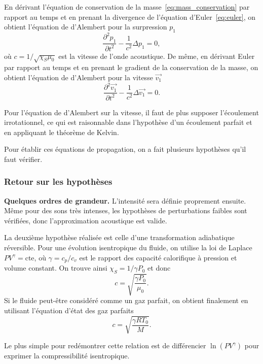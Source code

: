 En dérivant l'équation de conservation de la masse~\ref{eq:mass_conservation} par rapport au temps et en prenant la divergence de l'équation d'Euler~\ref{eq:euler}, on obtient l'équation de d'Alembert pour la surpression $p_1$
\begin{equation}
\frac{\partial^2 p_1}{\partial t^2} - \frac{1}{c^2}\Delta p_1 = 0,
\label{eq:dalembert_p}
\end{equation}
où $c=1/\sqrt{\chi_S \mu_0}$ est la vitesse de l'onde acoustique.
De même, en dérivant Euler par rapport au temps et en prenant le gradient de la conservation de la masse, on obtient l'équation de d'Alembert pour la vitesse $\overrightarrow{v_1}$
\begin{equation}
\frac{\partial^2 \overrightarrow{v_1}}{\partial t^2} - \frac{1}{c^2}\Delta \overrightarrow{v_1} = 0.
\label{eq:dalembert_v}
\end{equation}
\begin{remarque}
Pour l'équation de d'Alembert sur la vitesse, il faut de plus supposer l'écoulement irrotationnel, ce qui est raisonnable dans l'hypothèse d'un écoulement parfait et en appliquant le théorème de Kelvin.
\end{remarque}

\begin{transition}
Pour établir ces équations de propagation, on a fait plusieurs hypothèses qu'il faut vérifier.
\end{transition}

\subsubsection{Retour sur les hypothèses}

\begin{slide}
\textbf{Quelques ordres de grandeur.}
L'intensité sera définie proprement ensuite.
Même pour des sons très intenses, les hypothèses de perturbations faibles sont vérifiées, donc l'approximation acoustique est valide.
\end{slide}

La deuxième hypothèse réalisée est celle d'une transformation adiabatique réversible.
Pour une évolution isentropique du fluide, on utilise la loi de Laplace $PV^\gamma = \mathrm{cte}$, où $\gamma=c_p/c_v$ est le rapport des capacité calorifique à pression et volume constant.
On trouve ainsi $\chi_S = 1/\gamma P_0$ et donc
\begin{equation*}
c = \sqrt{\frac{\gamma P_0}{\mu_0}}.
\end{equation*}
Si le fluide peut-être considéré comme un gaz parfait, on obtient finalement en utilisant l'équation d'état des gaz parfaits
\begin{equation}
c = \sqrt{\frac{\gamma RT_0}{M}}.
\end{equation}
\begin{remarque}
Le plus simple pour redémontrer cette relation est de différencier $\ln(PV^\gamma)$ pour exprimer la compressibilité isentropique. 
\end{remarque}

